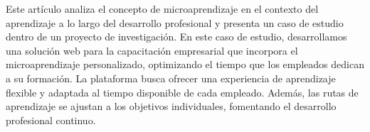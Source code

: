 Este artículo analiza el concepto de microaprendizaje en el contexto del
aprendizaje a lo largo del desarrollo profesional y presenta un caso de estudio dentro de un
proyecto de investigación. En este caso de estudio, desarrollamos una solución web para
la capacitación empresarial que incorpora el microaprendizaje personalizado,
optimizando el tiempo que los empleados dedican a su formación. La plataforma
busca ofrecer una experiencia de aprendizaje flexible y adaptada al tiempo
disponible de cada empleado. Además, las rutas de aprendizaje se ajustan a los
objetivos individuales, fomentando el desarrollo profesional continuo.